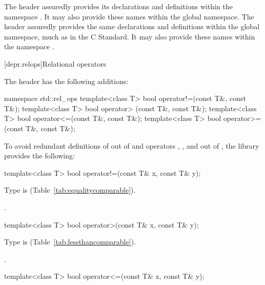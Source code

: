 \pnum
\begin{example}
The header
%
%
 assuredly
provides its declarations and definitions within the namespace
. It may also provide these names within the
global namespace.
The header
assuredly provides the same declarations and definitions within
the global namespace,
much as in the C Standard. It may also provide these names within
the namespace .
\end{example}

[depr.relops]{Relational operators}

\pnum
The header 
%
has the following additions:

\begin{codeblock}
namespace std::rel_ops {
  template<class T> bool operator!=(const T&, const T&);
  template<class T> bool operator> (const T&, const T&);
  template<class T> bool operator<=(const T&, const T&);
  template<class T> bool operator>=(const T&, const T&);
}
\end{codeblock}

\pnum
To avoid redundant definitions of  out of 
and operators \tcode{>}, \tcode{<=}, and \tcode{>=} out of ,
the library provides the following:

%
\begin{itemdecl}
template<class T> bool operator!=(const T& x, const T& y);
\end{itemdecl}

\begin{itemdescr}
\pnum
\requires
Type  is  (Table~\ref{tab:equalitycomparable}).

\pnum
\returns
{}.
\end{itemdescr}

%
\begin{itemdecl}
template<class T> bool operator>(const T& x, const T& y);
\end{itemdecl}

\begin{itemdescr}
\pnum
\requires
Type  is  (Table~\ref{tab:lessthancomparable}).

\pnum
\returns
{}.
\end{itemdescr}

%
\begin{itemdecl}
template<class T> bool operator<=(const T& x, const T& y);
\end{itemdecl}

